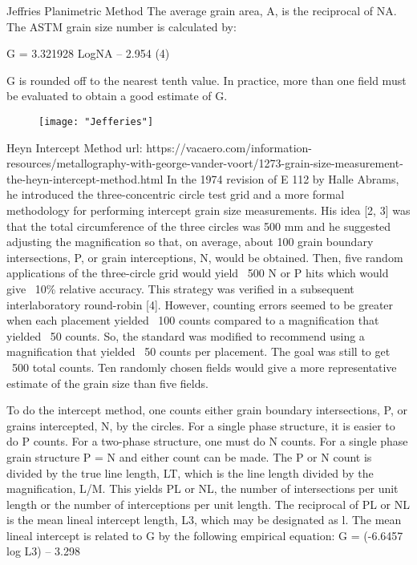 \documentclass[10pt]{beamer}
\begin{document}
{\begin{frame}[fragile]{Jeffries Planimetric Method}
The average grain area, A, is the reciprocal of NA. The ASTM grain size number is calculated by:

G = 3.321928 LogNA  –  2.954            (4)

G is rounded off to the nearest tenth value. In practice, more than one field must be evaluated to obtain a good estimate of G.

\begin{figure}[H]
\texttt{[image: "Jefferies"]}
\end{figure}
    
\end{frame}
}


{%
\begin{frame}[fragile]{Heyn Intercept Method}
url: https://vacaero.com/information-resources/metallography-with-george-vander-voort/1273-grain-size-measurement-the-heyn-intercept-method.html
In the 1974 revision of E 112 by Halle Abrams, he introduced the three-concentric circle test grid and a more formal methodology for performing intercept grain size measurements. His idea [2, 3] was that the total circumference of the three circles was 500 mm and he suggested adjusting the magnification so that, on average, about 100 grain boundary intersections, P, or grain interceptions, N, would be obtained. Then, five random applications of the three-circle grid would yield ~500 N or P hits which would give ~10\% relative accuracy. This strategy was verified in a subsequent interlaboratory round-robin [4]. However, counting errors seemed to be greater when each placement yielded ~100 counts compared to a magnification that yielded ~50 counts. So, the standard was modified to recommend using a magnification that yielded ~50 counts per placement. The goal was still to get ~500 total counts. Ten randomly chosen fields would give a more representative estimate of the grain size than five fields.

To do the intercept method, one counts either grain boundary intersections, P, or grains intercepted, N, by the circles. For a single phase structure, it is easier to do P counts. For a two-phase structure, one must do N counts. For a single phase grain structure P = N and either count can be made. The P or N count is divided by the true line length, LT, which is the line length divided by the magnification, L/M. This yields PL or NL, the number of intersections per unit length or the number of interceptions per unit length. The reciprocal of PL or NL is the mean lineal intercept length, L3, which may be designated as l. The mean lineal intercept is related to G by the following empirical equation:
							G = (-6.6457 log L3)  – 3.298      
							

\end{frame}}
\end{document}
